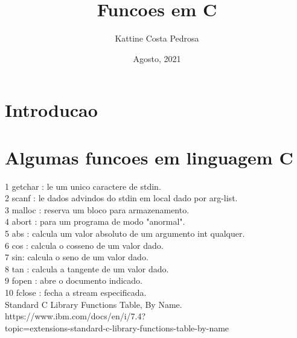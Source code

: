 \documentclass{article}
\title{Funcoes em C}
\author{Kattine Costa Pedrosa}
\date{Agosto, 2021}
\begin{document}
\maketitle

\section{Introducao}



\section{Algumas funcoes em linguagem C}
1 getchar : le um unico caractere de stdin.\\
2 scanf : le dados advindos do stdin em local dado por arg-list.\\
3 malloc : reserva um bloco para armazenamento.\\
4 abort : para um programa de modo "anormal".\\
5 abs : calcula um valor absoluto de um argumento int qualquer.\\
6 cos : calcula o cosseno de um valor dado.\\
7 sin: calcula o seno de um valor dado.\\
8 tan : calcula a tangente de um valor dado.\\
9 fopen : abre o documento indicado.\\
10 fclose : fecha a stream especificada.\\





Standard C Library Functions Table, By Name.\\
https://www.ibm.com/docs/en/i/7.4?\\
topic=extensions-standard-c-library-functions-table-by-name
\end{document}
